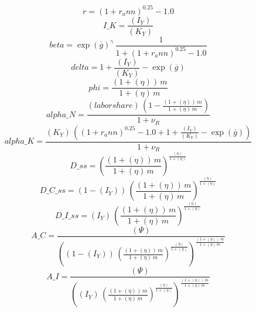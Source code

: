 \begin{dmath*}
r = \left(1+{{r_ann}}\right)^{0.25}-1.0
\end{dmath*}
\begin{dmath*}
I\_K = \frac{{(I_Y)}}{{(K_Y)}}
\end{dmath*}
\begin{dmath*}
beta = \exp\left({{\overline{g}}}\right)^{{{\gamma}}}\, \frac{1}{1+\left(1+{{r_ann}}\right)^{0.25}-1.0}
\end{dmath*}
\begin{dmath*}
delta = 1+\frac{{(I_Y)}}{{(K_Y)}}-\exp\left({{\overline{g}}}\right)
\end{dmath*}
\begin{dmath*}
phi = \frac{\left(1+{(\eta)}\right)\, {{m}}}{1+{(\eta)}\, {{m}}}
\end{dmath*}
\begin{dmath*}
alpha\_N = \frac{{(labor share)}\, \left(1-\frac{\left(1+{(\eta)}\right)\, {{m}}}{1+{(\eta)}\, {{m}}}\right)}{1+{{\nu_R}}}
\end{dmath*}
\begin{dmath*}
alpha\_K = \frac{{(K_Y)}\, \left(\left(1+{{r_ann}}\right)^{0.25}-1.0+1+\frac{{(I_Y)}}{{(K_Y)}}-\exp\left({{\overline{g}}}\right)\right)}{1+{{\nu_R}}}
\end{dmath*}
\begin{dmath*}
D\_ss = \left(\frac{\left(1+{(\eta)}\right)\, {{m}}}{1+{(\eta)}\, {{m}}}\right)^{\frac{{(\eta)}}{1+{(\eta)}}}
\end{dmath*}
\begin{dmath*}
D\_C\_ss = \left(1-{(I_Y)}\right)\, \left(\frac{\left(1+{(\eta)}\right)\, {{m}}}{1+{(\eta)}\, {{m}}}\right)^{\frac{{(\eta)}}{1+{(\eta)}}}
\end{dmath*}
\begin{dmath*}
D\_I\_ss = {(I_Y)}\, \left(\frac{\left(1+{(\eta)}\right)\, {{m}}}{1+{(\eta)}\, {{m}}}\right)^{\frac{{(\eta)}}{1+{(\eta)}}}
\end{dmath*}
\begin{dmath*}
A\_C = \frac{{(\Psi)}}{\left(\left(1-{(I_Y)}\right)\, \left(\frac{\left(1+{(\eta)}\right)\, {{m}}}{1+{(\eta)}\, {{m}}}\right)^{\frac{{(\eta)}}{1+{(\eta)}}}\right)^{\frac{\left(1+{(\eta)}\right)\, {{m}}}{1+{(\eta)}\, {{m}}}}}
\end{dmath*}
\begin{dmath*}
A\_I = \frac{{(\Psi)}}{\left({(I_Y)}\, \left(\frac{\left(1+{(\eta)}\right)\, {{m}}}{1+{(\eta)}\, {{m}}}\right)^{\frac{{(\eta)}}{1+{(\eta)}}}\right)^{\frac{\left(1+{(\eta)}\right)\, {{m}}}{1+{(\eta)}\, {{m}}}}}
\end{dmath*}
